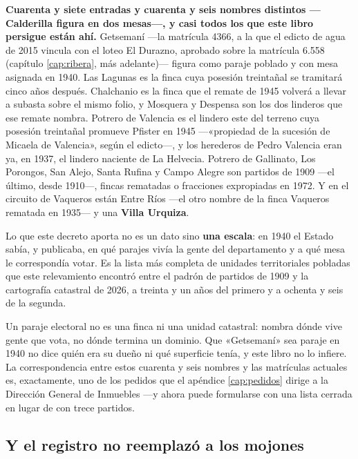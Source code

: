 \textbf{Cuarenta y siete entradas y cuarenta y seis nombres distintos ---Calderilla figura en dos mesas---, y casi todos los que este libro persigue están ahí.} Getsemaní
---la matrícula 4366, a la que el edicto de agua de 2015 vincula con el loteo El Durazno, aprobado sobre la matrícula 6.558 (capítulo \ref{cap:ribera}, más adelante)--- figura como paraje
poblado y con mesa asignada en 1940. Las Lagunas es la finca cuya posesión treintañal se
tramitará cinco años después. Chalchanio es la finca que el remate de 1945 volverá a llevar
a subasta sobre el mismo folio, y Mosquera y Despensa son los dos linderos que ese remate
nombra. Potrero de Valencia es el lindero este del terreno cuya posesión treintañal promueve
Pfister en 1945 ---«propiedad de la sucesión de Micaela de Valencia», según el edicto---, y
los herederos de Pedro Valencia eran ya, en 1937, el lindero naciente de La Helvecia. Potrero de Gallinato, Los Porongos, San Alejo,
Santa Rufina y Campo Alegre son partidos de 1909 ---el último, desde 1910---, fincas rematadas o fracciones expropiadas
en 1972. Y en el circuito de Vaqueros están Entre Ríos ---el otro nombre de la finca Vaqueros
rematada en 1935--- y una \textbf{Villa Urquiza}.

Lo que este decreto aporta no es un dato sino \textbf{una escala}: en 1940 el Estado sabía, y
publicaba, en qué parajes vivía la gente del departamento y a qué mesa le correspondía votar.
Es la lista más completa de unidades territoriales pobladas que este relevamiento encontró
entre el padrón de partidos de 1909 y la cartografía catastral de 2026, a treinta y un años del primero y a ochenta y seis
de la segunda.

\begin{cautela}
Un paraje electoral no es una finca ni una unidad catastral: nombra dónde vive gente que vota,
no dónde termina un dominio. Que «Getsemaní» sea paraje en 1940 no dice quién era su dueño ni
qué superficie tenía, y este libro no lo infiere. La correspondencia entre estos cuarenta y
seis nombres y las matrículas actuales es, exactamente, uno de los pedidos que el apéndice
\ref{cap:pedidos} dirige a la Dirección General de Inmuebles ---y ahora puede formularse con
una lista cerrada en lugar de con trece partidos.
\end{cautela}

\subsection*{Y el registro no reemplazó a los mojones}

